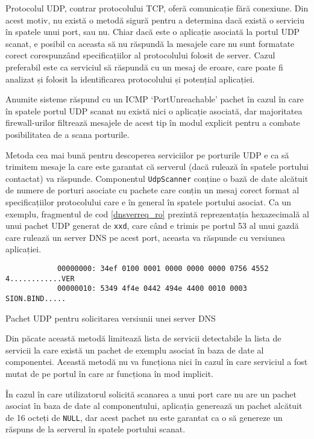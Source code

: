 	Protocolul UDP, contrar protocolului TCP, oferă comunicație fără conexiune. Din acest motiv, nu există o metodă sigură pentru a determina dacă există o serviciu în spatele unui port, sau nu. Chiar dacă este o aplicație asociată la portul UDP scanat, e posibil ca aceasta să nu răspundă la mesajele care nu sunt formatate corect corespunzând specificațiilor al protocolului folosit de server. Cazul preferabil este ca serviciul să răspundă cu un mesaj de eroare, care poate fi analizat și folosit la identificarea protocolului și potențial aplicației.
	
	Anumite sisteme răspund cu un ICMP `PortUnreachable' pachet în cazul în care în spatele portul UDP scanat nu există nici o aplicație asociată, dar majoritatea firewall-urilor filtrează mesajele de acest tip în modul explicit pentru a combate posibilitatea de a scana porturile.
	
	Metoda cea mai bună pentru descoperea serviciilor pe porturile UDP e ca să trimitem mesaje la care este garantat că serverul (dacă rulează în spatele portului contactat) va răspunde. Componentul \texttt{UdpScanner} conține o bază de date alcătuit de numere de porturi asociate cu pachete care conțin un mesaj corect format al specificațiilor protocolului care e în general în spatele portului asociat. Ca un exemplu, fragmentul de cod \ref{dnsverreq_ro} prezintă reprezentația hexazecimală al unui pachet UDP generat de \texttt{xxd}, care când e trimis pe portul 53 al unui gazdă care rulează un server DNS pe acest port, aceasta va răspunde cu versiunea aplicației.
	
	\begin{listing}[H]
		\begin{verbatim}
			00000000: 34ef 0100 0001 0000 0000 0000 0756 4552  4............VER
			00000010: 5349 4f4e 0442 494e 4400 0010 0003       SION.BIND.....
		\end{verbatim}
		\caption{Pachet UDP pentru solicitarea versiunii unei server DNS}
		\label{dnsverreq_ro}
	\end{listing}
	
	Din păcate această metodă limitează lista de servicii detectabile la lista de servicii la care există un pachet de exemplu asociat în baza de date al componentei. Această metodă nu va funcționa nici în cazul în care serviciul a fost mutat de pe portul în care ar funcționa în mod implicit.
	
	În cazul în care utilizatorul solicită scanarea a unui port care nu are un pachet asociat în baza de date al componentului, aplicația generează un pachet alcătuit de 16 octeți de \texttt{NULL}, dar acest pachet nu este garantat ca o să genereze un răspuns de la serverul în spatele portului scanat.
	

